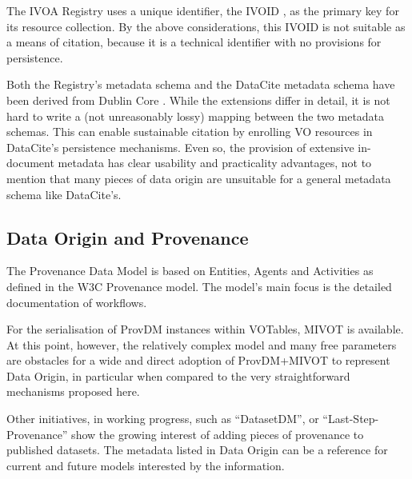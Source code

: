 \documentclass[11pt,a4paper]{ivoa}
\begin{document}
The IVOA Registry uses a unique identifier, the IVOID
\citep{2016ivoa.spec.0523D}, as the primary key for its resource
collection.  By the above considerations, this IVOID is not suitable as a means of citation, because it is a technical identifier with no provisions for persistence.

Both the Registry's metadata schema and the DataCite
\citep{std:DataCite40} metadata schema have been
derived from Dublin Core \citep{std:DUBLINCORE}.  While the extensions differ in detail, it is not
hard to write a (not unreasonably lossy) mapping between the two metadata schemas.  This can enable
sustainable citation by enrolling VO resources in DataCite's persistence
mechanisms.  Even so, the provision of extensive in-document metadata
has clear usability and practicality advantages, not to mention that many
pieces of data origin are unsuitable for a general metadata schema like
DataCite's.

\subsection{Data Origin and Provenance}

The Provenance Data Model \citep{2020ivoa.spec.0411S} is based on Entities, Agents and Activities as defined in the W3C Provenance model. The model's main focus is the detailed documentation of workflows.

For the serialisation of ProvDM instances within VOTables, MIVOT \citep{2023ivoa.spec.0620M} is available.  At this point, however, the relatively complex model and many free parameters are obstacles for a wide and direct adoption of ProvDM+MIVOT to represent Data Origin, in particular when compared to the very straightforward mechanisms proposed here.


Other initiatives, in working progress, such as ``DatasetDM'', or
``Last-Step-Provenance'' show the growing interest of adding pieces of
provenance to published datasets.
The metadata listed in Data Origin can be a reference for current
and future models interested by the information.
\end{document}

